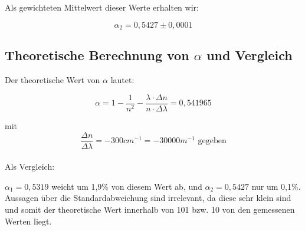 Als gewichteten Mittelwert dieser Werte erhalten wir:

$$\boxed{\alpha_2 = 0,5427 \pm  0,0001}$$

\subsection{Theoretische Berechnung von $\alpha$ und Vergleich}

Der theoretische Wert von $\alpha$ lautet:

$$\alpha = 1 - \frac{1}{n^2} - \frac{\lambda\cdot\Delta n}{n \cdot\Delta\lambda} = 0,541965$$

mit $$\frac{\Delta n}{\Delta\lambda} = -300cm^{-1} = -30000m^{-1} \text{ \ gegeben}$$\\

Als Vergleich:

$\alpha_1 = 0,5319$ weicht um 1,9\% von diesem Wert ab, und $\alpha_2=0,5427$ nur um 0,1\%. Aussagen über die Standardabweichung sind irrelevant, da diese sehr klein sind und somit der theoretische Wert innerhalb von 101 bzw. 10 von den gemessenen Werten liegt.

\clearpage









